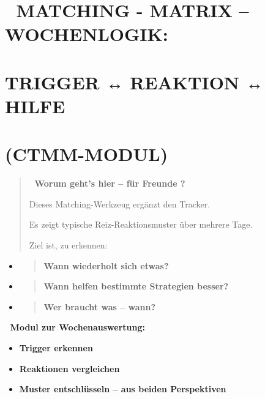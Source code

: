 \hypertarget{matching---matrix-wochenlogik}{%
\section{\texorpdfstring{🧩 \textbf{MATCHING - MATRIX -- WOCHENLOGIK:}}{🧩 MATCHING - MATRIX -- WOCHENLOGIK:}}\label{matching---matrix-wochenlogik}}

\hypertarget{trigger-reaktion-hilfe}{%
\section{\texorpdfstring{\textbf{TRIGGER ↔ REAKTION ↔ HILFE}}{TRIGGER ↔ REAKTION ↔ HILFE}}\label{trigger-reaktion-hilfe}}

\hypertarget{ctmm-modul}{%
\section{\texorpdfstring{\textbf{(CTMM-MODUL)}}{(CTMM-MODUL)}}\label{ctmm-modul}}

\begin{quote}
🧠 \textbf{Worum geht's hier -- für Freunde ?}

Dieses Matching-Werkzeug ergänzt den Tracker.

Es zeigt typische Reiz-Reaktionsmuster über mehrere Tage.

Ziel ist, zu erkennen:
\end{quote}

\begin{itemize}
\item
  \begin{quote}
  \textbf{Wann wiederholt sich etwas?}
  \end{quote}
\item
  \begin{quote}
  \textbf{Wann helfen bestimmte Strategien besser?}
  \end{quote}
\item
  \begin{quote}
  \textbf{Wer braucht was -- wann?}
  \end{quote}
\end{itemize}

🧩 \textbf{Modul zur Wochenauswertung:}

\begin{itemize}
\item
  \textbf{Trigger erkennen}
\item
  \textbf{Reaktionen vergleichen}
\item
  \textbf{Muster entschlüsseln -- aus beiden Perspektiven}
\end{itemize}

